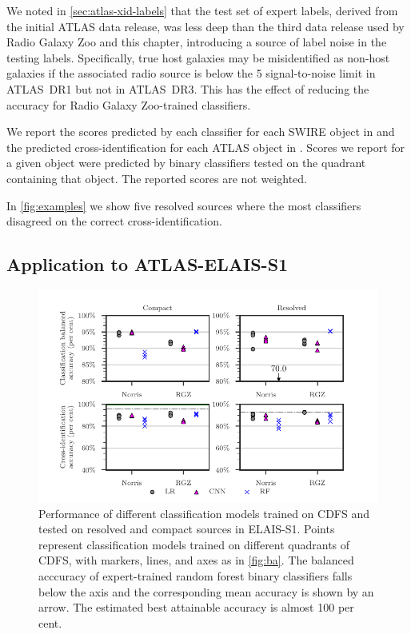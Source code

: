     We noted in \autoref{sec:atlas-xid-labels} that the test set of expert labels,
    derived from the initial ATLAS data release, was less deep than the third
    data release used by Radio Galaxy Zoo and this chapter, introducing a source
    of label noise in the testing labels. Specifically, true host galaxies may
    be misidentified as non-host galaxies if the associated radio source is
    below the 5 signal-to-noise limit in ATLAS~DR1 but not in ATLAS~DR3. This
    has the effect of reducing the accuracy for Radio Galaxy Zoo-trained
    classifiers.

    {We report the scores predicted by each classifier for each
    SWIRE object in  and the predicted
    cross-identification for each ATLAS object in .
    Scores we report for a given object were predicted by binary
    classifiers tested on the quadrant containing that object. The reported scores are not weighted.}

    In \autoref{fig:examples} we show five resolved sources where the most classifiers disagreed on the correct cross-identification.

\subsection{Application to ATLAS-ELAIS-S1}
  \label{sec:atlas-xid-elais}

  \begin{figure}
  \centering
  \includegraphics[]{atlas-images/elais-grid-new.pdf}
  \caption[Performance of different classification models on the binary classification task, tested on ELAIS-S1.]{Performance of different classification models trained on CDFS and tested on
  resolved and compact sources in ELAIS-S1. Points represent classification models
  trained on different quadrants of CDFS, with markers, lines, and axes as in
  \autoref{fig:ba}. The balanced acccuracy of expert-trained random forest
  binary classifiers falls below the axis and the corresponding mean accuracy is
  shown by an arrow. The estimated best attainable accuracy is almost 100 per cent.
    \label{fig:elais-ba}}
  \end{figure}

